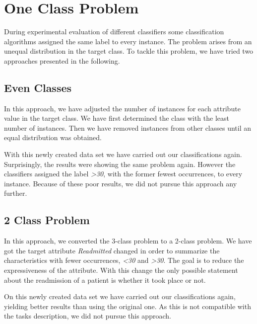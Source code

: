 \section{One Class Problem}
\label{ocp}

During experimental evaluation of different classifiers some classification algorithms assigned the same label to every 
instance. The problem arises from an unequal distribution in the target class. To tackle this problem, we have tried 
two approaches presented in the following.

\subsection{Even Classes}
\label{even}
In this approach, we have adjusted the number of instances for each attribute value in the target class. We have first 
determined the class with the least number of instances. Then we have removed instances from other classes until
an equal distribution was obtained.

With this newly created data set we have carried out our classifications again.
Surprisingly, the results were showing the same problem again. However the classifiers assigned the label 
\textit{ \textgreater 30}, with the former fewest occurrences, to every instance.
Because of these poor results, we did not pursue this approach any further.




\subsection{2 Class Problem}
\label{2class}

In this approach, we converted the 3-class problem to a 2-class problem.
We have got the target attribute \textit{Readmitted} changed in order to summarize the characteristics with fewer 
occurrences, \textit{ \textless 30} and \textit{ \textgreater 30}.
The goal is to reduce the expressiveness of the attribute. With this change the only possible statement about the 
readmission of a patient is whether it took place or not.

On this newly created data set we have carried out our classifications again, yielding better results than using the 
original one. As this is not compatible with the tasks description, we did not pursue this approach.

